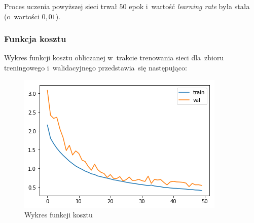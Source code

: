 \documentclass[11pt, a4paper]{article}
\begin{document}
Proces uczenia powyższej sieci trwał $50$ epok i~wartość \textit{learning rate} była stała (o~wartości $0,01$).

\subsubsection{Funkcja kosztu}
Wykres funkcji kosztu obliczanej w~trakcie trenowania sieci dla~zbioru treningowego i~walidacyjnego przedstawia~się następująco:
\begin{figure}[H]
\centering
    \includegraphics[scale=0.8]{loss_func.png}
    \caption{Wykres funkcji kosztu}
\end{figure}
\end{document}
